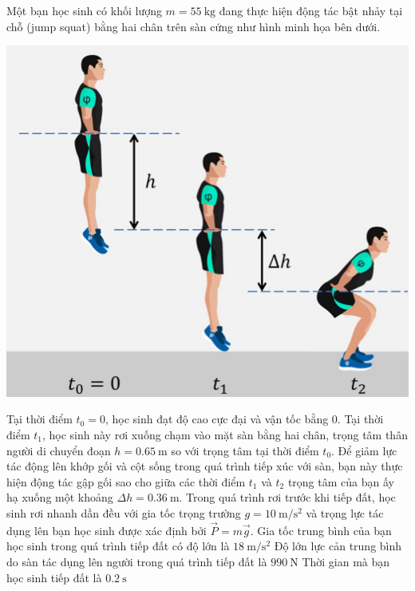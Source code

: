 \begin{ex}
	Một bạn học sinh có khối lượng $m=\SI{55}{\kilogram}$ đang thực hiện động tác bật nhảy tại chỗ (jump squat) bằng hai chân trên sàn cứng như hình minh họa bên dưới.
	\begin{center}
		\includegraphics[width=0.4\linewidth]{figs/D10-HKI-KTTX2-001-5}
	\end{center} 
	Tại thời điểm $t_0=0$, học sinh đạt độ cao cực đại và vận tốc bằng 0. Tại thời điểm $t_1$, học sinh này rơi xuống chạm vào mặt sàn bằng hai chân, trọng tâm thân người di chuyển đoạn $h=\SI{0.65}{\meter}$ so với trọng tâm tại thời điểm $t_0$. Để giảm lực tác động lên khớp gối và cột sống trong quá trình tiếp xúc với sàn, bạn này thực hiện động tác gập gối sao cho giữa các thời điểm $t_1$ và $t_2$ trọng tâm của bạn ấy hạ xuống một khoảng $\Delta h=\SI{0.36}{\meter}$.  Trong quá trình rơi trước khi tiếp đất, học sinh rơi nhanh dần đều với gia tốc trọng trường $g=\SI{10}{\meter/\second^2}$ và trọng lực tác dụng lên bạn học sinh được xác định bởi $\vec{P}=m\vec{g}$.
	{\True Gia tốc trung bình của bạn học sinh trong quá trình tiếp đất có độ lớn là $\SI{18}{\meter/\second^2}$}
	{Độ lớn lực cản trung bình do sàn tác dụng lên người trong quá trình tiếp đất là $\SI{990}{\newton}$}
	{\True Thời gian mà bạn học sinh tiếp đất là $\SI{0.2}{\second}$}
\end{ex}
